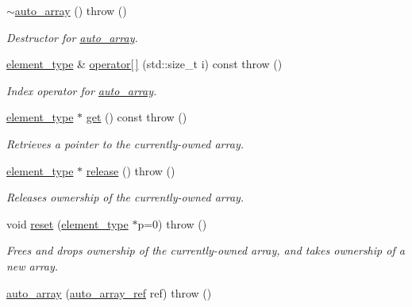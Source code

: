 \begin{DoxyCompactItemize}
\hyperlink{classLibWheel_1_1auto__array_a2a791a2e73270d0e9353d4359a20d25c}{$\sim$auto\-\_\-array} ()  throw ()
\begin{DoxyCompactList}\small\item\em \-Destructor for \hyperlink{classLibWheel_1_1auto__array}{auto\-\_\-array}. \end{DoxyCompactList}\item 
\hyperlink{classLibWheel_1_1auto__array_a8c06b91597d32a42388eaad80ae5f656}{element\-\_\-type} \& \hyperlink{classLibWheel_1_1auto__array_a155b35cec40da18a6c706329c5f27257}{operator\mbox{[}$\,$\mbox{]}} (std\-::size\-\_\-t i) const   throw ()
\begin{DoxyCompactList}\small\item\em \-Index operator for \hyperlink{classLibWheel_1_1auto__array}{auto\-\_\-array}. \end{DoxyCompactList}\item 
\hyperlink{classLibWheel_1_1auto__array_a8c06b91597d32a42388eaad80ae5f656}{element\-\_\-type} $\ast$ \hyperlink{classLibWheel_1_1auto__array_a1c2de06b5c798d33a4fa38c73521d3e9}{get} () const   throw ()
\begin{DoxyCompactList}\small\item\em \-Retrieves a pointer to the currently-\/owned array. \end{DoxyCompactList}\item 
\hyperlink{classLibWheel_1_1auto__array_a8c06b91597d32a42388eaad80ae5f656}{element\-\_\-type} $\ast$ \hyperlink{classLibWheel_1_1auto__array_a421fcbd078e6ae0a8fcfbe0bd7afe69d}{release} ()  throw ()
\begin{DoxyCompactList}\small\item\em \-Releases ownership of the currently-\/owned array. \end{DoxyCompactList}\item 
void \hyperlink{classLibWheel_1_1auto__array_a3304b57bc7ab1cc91c3c638f9150ec05}{reset} (\hyperlink{classLibWheel_1_1auto__array_a8c06b91597d32a42388eaad80ae5f656}{element\-\_\-type} $\ast$p=0)  throw ()
\begin{DoxyCompactList}\small\item\em \-Frees and drops ownership of the currently-\/owned array, and takes ownership of a new array. \end{DoxyCompactList}\item 
\hyperlink{classLibWheel_1_1auto__array_ab1da017eb72f79f607a0a3a2efd3d3c0}{auto\-\_\-array} (\hyperlink{structLibWheel_1_1auto__array_1_1auto__array__ref}{auto\-\_\-array\-\_\-ref} ref)  throw ()

\end{DoxyCompactItemize}
